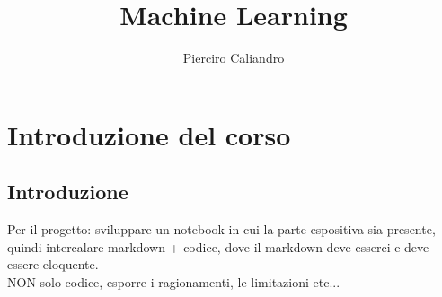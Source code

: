 \documentclass[12pt, oneside]{extbook}
\title{Machine Learning}
\author{Pierciro Caliandro}
\begin{document}
\maketitle
\tableofcontents
\chapter{Introduzione del corso}
\section{Introduzione}
Per il progetto: sviluppare	un notebook in cui la parte espositiva sia presente, quindi intercalare markdown + codice, dove il markdown deve esserci e deve essere eloquente.\\NON solo codice, esporre i ragionamenti, le limitazioni etc...\\
\end{document}
